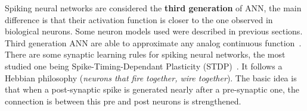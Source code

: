 Spiking neural networks are considered the \textbf{third generation} of ANN, the main difference is that their activation function is closer to the one observed in biological neurons. Some neuron models used were described in previous sections. Third generation ANN are able to approximate any analog continuous function~\cite{third-gen-nn-Maass1997}. 
There are some synaptic learning rules for spiking neural networks, the most studied one being Spike-Timing-Dependant Plasticity (STDP)~\cite{STDP-Song2000}. 
It follows a Hebbian philosophy (\emph{neurons that fire together, wire together}). The basic idea is that when a post-synaptic spike is generated nearly after a pre-synaptic one, the connection is between this pre and post neurons is strengthened.

